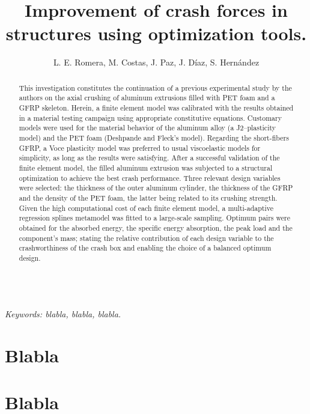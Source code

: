 \documentclass[cmfonts]{witpress}
\begin{document}
\title{Improvement of crash forces in structures using optimization tools.}

\author{L. E. Romera, M. Costas, J. Paz, J. D\'iaz, S. Hern\'andez}

\address{Structural Mechanics Group, Universidade da Coru\~na, Spain}

\maketitle

\begin{abstract}
This investigation constitutes the continuation of a previous experimental study by the authors on the axial crushing of aluminum extrusions filled with PET foam and a GFRP skeleton. Herein, a finite element model was calibrated with the results obtained in a material testing campaign using appropriate constitutive equations. Customary models were used for the material behavior of the aluminum alloy (a J2--plasticity model) and the PET foam (Deshpande and Fleck's model). Regarding the short-fibers GFRP, a Voce plasticity model was preferred to usual viscoelastic models for simplicity, as long as the results were satisfying. After a successful validation of the finite element model, the filled aluminum extrusion was subjected to a structural optimization to achieve the best crash performance. Three relevant design variables were selected: the thickness of the outer aluminum cylinder, the thickness of the GFRP and the density of the PET foam, the latter being related to its crushing strength. Given the high computational cost of each finite element model, a multi-adaptive regression splines metamodel was fitted to a large-scale sampling. Optimum pairs were obtained for the absorbed energy, the specific energy absorption, the peak load and the component's mass; stating the relative contribution of each design variable to the crashworthiness of the crash box and enabling the choice of a balanced optimum design.
\end{abstract}\\
\emph{Keywords: blabla, blabla, blabla.}

\section{Blabla}
\cite{funke84}
\section{Blabla}
\cite{brebbia84}



\end{document}
